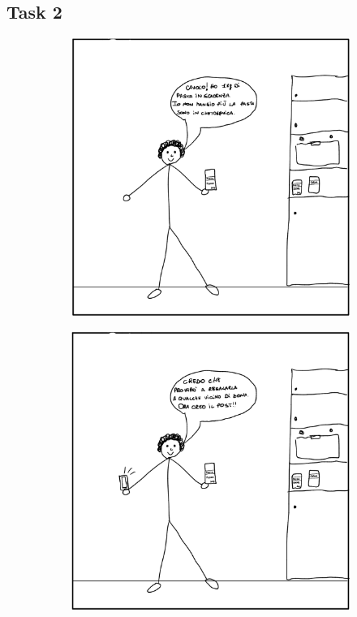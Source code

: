 \documentclass{article}
\begin{document}
\subsection{Task 2}
\begin{figure}[H]
    \centering
    \begin{subfigure}{0.25\textwidth}
        \centering
        \includegraphics[width=\textwidth]{Storyboard/task2-img/t2.1.png}
    \end{subfigure}
    \hspace{0.02\textwidth}
    \begin{subfigure}{0.25\textwidth}
        \centering
        \includegraphics[width=\textwidth]{Storyboard/task2-img/t2.2.png}

\end{subfigure}
\end{figure}
\end{document}

